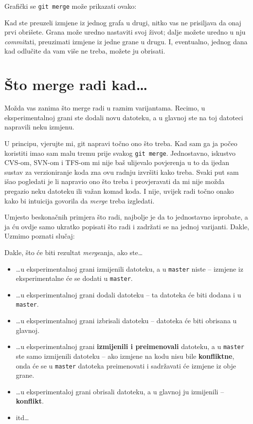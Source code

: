 Grafički se \verb+git merge+ može prikazati ovako:



Kad ste preuzeli izmjene iz jednog grafa u drugi, nitko vas ne prisiljava da onaj prvi obrišete. 
Grana može uredno nastaviti svoj život; dalje možete uredno u nju \emph{commit}ati, preuzimati izmjene iz jedne grane u drugu.
I, eventualno, jednog dana kad odlučite da vam više ne treba, možete ju obrisati.





\section*{Što merge radi kad\dots}

Možda vas zanima što merge radi u raznim varijantama.
Recimo, u eksperimentalnoj grani ste dodali novu datoteku, a u glavnoj ste na toj datoteci napravili neku izmjenu.

U principu, vjerujte mi, git napravi točno ono što treba. 
Kad sam ga ja počeo koristiti imao sam malu tremu prije svakog \verb+git merge+.
Jednostavno, iskustvo CVS-om, SVN-om i TFS-om mi nije baš ulijevalo povjerenja u to da ijedan sustav za verzioniranje koda zna ovu radnju izvršiti kako treba.
Svaki put sam išao pogledati je li napravio ono što treba i provjeravati da mi nije možda pregazio neku datoteku ili važan komad koda.
I nije, uvijek radi točno onako kako bi intuicija govorila da \emph{merge} treba izgledati.

Umjesto beskonačnih primjera što radi, najbolje je da to jednostavno isprobate, a ja ću ovdje samo ukratko popisati što radi i zadržati se na jednoj varijanti. Dakle, 
Uzmimo poznati slučaj:



Dakle, što će biti rezultat \emph{merge}anja, ako ste\dots

\begin{itemize}
	\item \dots{}u eksperimentalnoj grani izmijenili datoteku, a u \verb+master+ niste -- izmjene iz eksperimentalne će se dodati u \verb+master+.
	\item \dots{}u eksperimentalnoj grani dodali datoteku -- ta datoteka će biti dodana i u \verb+master+.
	\item \dots{}u eksperimentalnoj grani izbrisali datoteku -- datoteka će biti obrisana u glavnoj.
	\item \dots{}u eksperimentalnoj grani \textbf{izmijenili i preimenovali} datoteku, a u \verb+master+ ste samo izmijenili datoteku -- ako izmjene na kodu nisu bile \textbf{konfliktne}, onda će se u \verb+master+ datoteka preimenovati i sadržavati će izmjene iz obje grane.
	\item \dots{}u eksperimentaloj grani obrisali datoteku, a u glavnoj ju izmijenili -- \textbf{konflikt}.
	\item itd\dots
\end{itemize}

